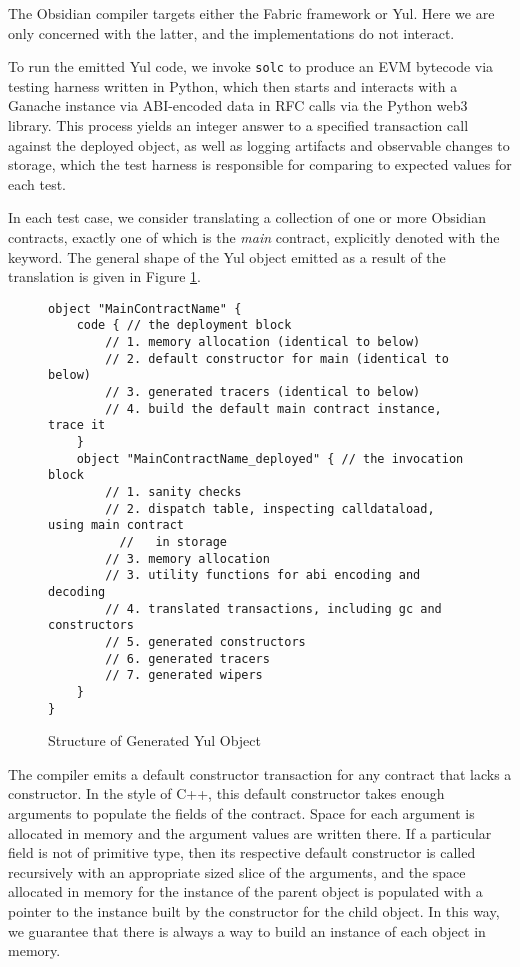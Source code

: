 The Obsidian compiler targets either the Fabric framework or Yul. Here we
are only concerned with the latter, and the implementations do not
interact.

To run the emitted Yul code, we invoke \texttt{solc} to produce an EVM
bytecode via testing harness written in Python, which then starts and
interacts with a Ganache instance via ABI-encoded data in RFC calls via the
Python web3 library. This process yields an integer answer to a specified
transaction call against the deployed object, as well as logging artifacts
and observable changes to storage, which the test harness is responsible
for comparing to expected values for each test.

In each test case, we consider translating a collection of one or more
Obsidian contracts, exactly one of which is the \emph{main} contract,
explicitly denoted with the  keyword. The general shape of the
Yul object emitted as a result of the translation is given in
Figure \ref{code.1}.

\begin{figure}[hbtp]
    \caption{Structure of Generated Yul Object}
    \label{code.1}
    \begin{lstlisting}[language=yul,frame=single]
object "MainContractName" {
    code { // the deployment block
        // 1. memory allocation (identical to below)
        // 2. default constructor for main (identical to below)
        // 3. generated tracers (identical to below)
        // 4. build the default main contract instance, trace it
    }
    object "MainContractName_deployed" { // the invocation block
        // 1. sanity checks
        // 2. dispatch table, inspecting calldataload, using main contract
          //   in storage
        // 3. memory allocation
        // 3. utility functions for abi encoding and decoding
        // 4. translated transactions, including gc and constructors
        // 5. generated constructors
        // 6. generated tracers
        // 7. generated wipers
    }
}
    \end{lstlisting}
\end{figure}

The compiler emits a default constructor transaction for any contract that
lacks a constructor. In the style of C++, this default constructor takes
enough arguments to populate the fields of the contract. \cite{TODO} Space
for each argument is allocated in memory and the argument values are
written there. If a particular field is not of primitive type, then its
respective default constructor is called recursively with an appropriate
sized slice of the arguments, and the space allocated in memory for the
instance of the parent object is populated with a pointer to the instance
built by the constructor for the child object. In this way, we guarantee
that there is always a way to build an instance of each object in memory.

